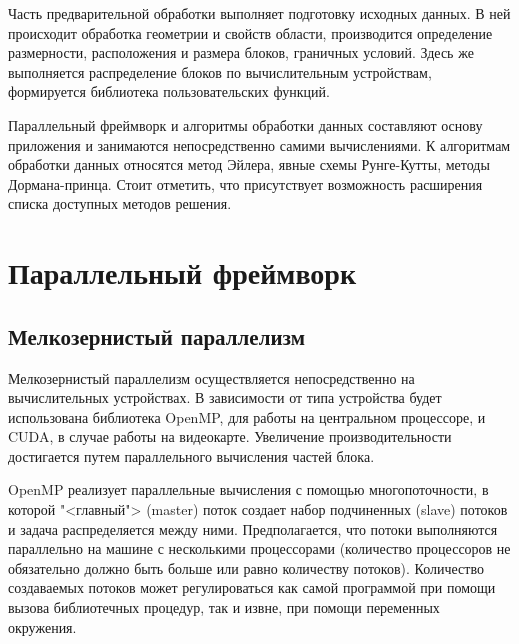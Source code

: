 \documentclass[a4paper, 14pt]{article}
\theoremstyle{definition}
\begin{document}
\par Часть предварительной обработки выполняет подготовку исходных данных. В ней происходит обработка геометрии и свойств области, производится определение размерности, расположения и размера блоков, граничных условий. Здесь же выполняется распределение блоков по вычислительным устройствам, формируется библиотека пользовательских функций.

\par Параллельный фреймворк и алгоритмы обработки данных составляют основу приложения и занимаются непосредственно самими вычислениями. К алгоритмам обработки данных относятся метод Эйлера, явные схемы Рунге-Кутты, методы Дормана-принца. Стоит отметить, что присутствует возможность расширения списка доступных методов решения.

\newpage
\section{Параллельный фреймворк}


\subsection{Мелкозернистый параллелизм}

\par Мелкозернистый параллелизм осуществляется непосредственно на вычислительных устройствах. В зависимости от типа устройства будет использована библиотека OpenMP, для работы на центральном процессоре, и CUDA, в случае работы на видеокарте. Увеличение производительности достигается путем параллельного вычисления частей блока.

\par OpenMP реализует параллельные вычисления с помощью многопоточности, в которой "<главный"> (master) поток создает набор подчиненных (slave) потоков и задача распределяется между ними. Предполагается, что потоки выполняются параллельно на машине с несколькими процессорами (количество процессоров не обязательно должно быть больше или равно количеству потоков). Количество создаваемых потоков может регулироваться как самой программой при помощи вызова библиотечных процедур, так и извне, при помощи переменных окружения.
\end{document}
